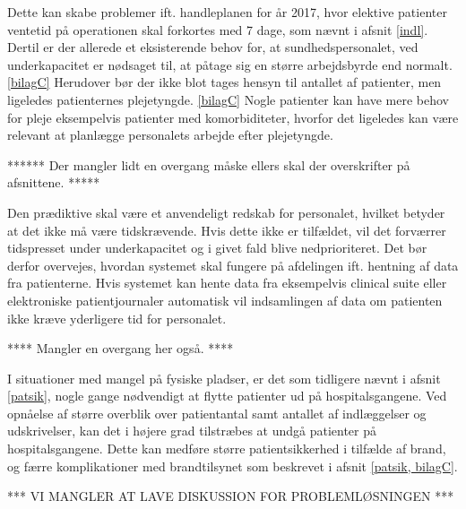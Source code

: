 Dette kan skabe problemer ift. handleplanen for år 2017, hvor elektive patienter ventetid på operationen skal forkortes med 7 dage, som nævnt i afsnit \ref{indl}. Dertil er der allerede et eksisterende behov for, at sundhedspersonalet, ved underkapacitet er nødsaget til, at påtage sig en større arbejdsbyrde end normalt. \ref{bilagC} Herudover bør der ikke blot tages hensyn til antallet af patienter, men ligeledes patienternes plejetyngde. \ref{bilagC} Nogle patienter kan have mere behov for pleje eksempelvis patienter med komorbiditeter, hvorfor det ligeledes kan være relevant at planlægge personalets arbejde efter plejetyngde. 


****** Der mangler lidt en overgang måske ellers skal der overskrifter på afsnittene. *****

\noindent
Den prædiktive skal være et anvendeligt redskab for personalet, hvilket betyder at det ikke må være tidskrævende. Hvis dette ikke er tilfældet, vil det forværrer tidspresset under underkapacitet og i givet fald blive nedprioriteret. Det bør derfor overvejes, hvordan systemet skal fungere på afdelingen ift. hentning af data fra patienterne. Hvis systemet kan hente data fra eksempelvis clinical suite eller elektroniske patientjournaler automatisk vil indsamlingen af data om patienten ikke kræve yderligere tid for personalet. 


**** Mangler en overgang her også. ****


I situationer med mangel på fysiske pladser, er det som tidligere nævnt i afsnit \ref{patsik}, nogle gange nødvendigt at flytte patienter ud på hospitalsgangene. Ved opnåelse af større overblik over patientantal samt antallet af indlæggelser og udskrivelser, kan det i højere grad tilstræbes at undgå patienter på hospitalsgangene. Dette kan medføre større patientsikkerhed i tilfælde af brand, og færre komplikationer med brandtilsynet som beskrevet i afsnit \ref{patsik, bilagC}. 

*** VI MANGLER AT LAVE DISKUSSION FOR PROBLEMLØSNINGEN ***